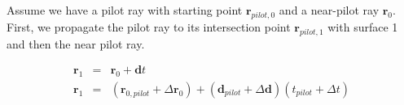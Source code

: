 \documentclass[12pt,a4paper,twoside,openright,BCOR10mm,headsepline,titlepage,abstracton,chapterprefix,final]{scrreprt}
\newcommand\Vector[1]{{\mathbf{#1}}}
\begin{document}
Assume we have a pilot ray with starting point $\Vector{r}_{pilot,0}$ and a near-pilot ray ${\Vector{r}_0}$.
First, we propagate the pilot ray to its intersection point $\Vector{r}_{pilot,1}$ with surface 1 and then the near pilot ray.

\begin{eqnarray}
 \Vector{r}_1 &=& \Vector{r}_0 + \Vector{d} t \\
 \Vector{r}_1 &=& (\Vector{r}_{0,pilot} + \Delta\Vector{r}_0) + (\Vector{d}_{pilot} + \Delta\Vector{d}) (t_{pilot} + \Delta t) \\ 
\end{eqnarray} 
\end{document}

